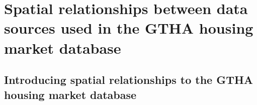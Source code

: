 \chapter{Spatial relationships between data sources used in the GTHA housing market database} \label{ch:spatial_relationships}

\section{Introducing spatial relationships to the GTHA housing market database} \label{sec:intro_spatial_relationships}


